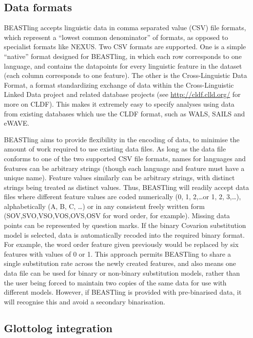 \documentclass[twocolumn,10pt]{scrartcl}
\begin{document}
\subsection{Data formats}

BEASTling accepts linguistic data in comma separated value (CSV) file formats, which represent a ``lowest common denominator'' of formats, as opposed to specialist formats like NEXUS.  Two CSV formats are supported.  One is a simple ``native'' format designed for BEASTling, in which each row corresponds to one language, and contains the datapoints for every linguistic feature in the dataset (each column corresponds to one feature).  The other is the Cross-Linguistic Data Format\cite{Forkel2016}, a format standardizing exchange of data within the Cross-Linguistic Linked Data project and related database projects (see \url{http://cldf.clld.org/} for more on CLDF).  This makes it extremely easy to specify analyses using data from existing databases which use the CLDF format, such as WALS, SAILS and eWAVE\cite{Kortmann2013}.

BEASTling aims to provide flexibility in the encoding of data, to minimise the amount of work required to use existing data files.  As long as the data file conforms to one of the two supported CSV file formats, names for languages and features can be arbitrary strings (though each language and feature must have a unique name).  Feature values similarly can be arbitrary strings, with distinct strings being treated as distinct values.  Thus, BEASTling will readily accept data files where different feature values are coded numerically (0, 1, 2,\ldots or 1, 2, 3,\ldots), alphabetically (A, B, C, \ldots) or in any consistent freely written form (SOV,SVO,VSO,VOS,OVS,OSV for word order, for example).  Missing data points can be represented by question marks.  If the binary Covarion substitution model is selected, data is automatically recoded into the required binary format.  For example, the word order feature given previously would be replaced by six features with values of 0 or 1.  This approach permits BEASTling to share a single substitution rate across the newly created features, and also means one data file can be used for binary or non-binary substitution models, rather than the user being forced to maintain two copies of the same data for use with different models.  However, if BEASTling is provided with pre-binarised data, it will recognise this and avoid a secondary binarisation.

\subsection{Glottolog integration}
\end{document}
